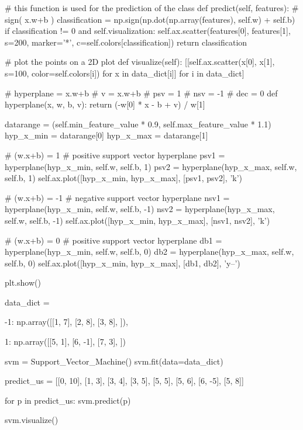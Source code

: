 \documentclass[11pt]{article}
\begin{document}
\begin{python}
    # this function is used for the prediction of the class
    def predict(self, features):
        # sign( x.w+b )
        classification = np.sign(np.dot(np.array(features),
                                        self.w) + self.b)
        if classification != 0 and self.visualization:
            self.ax.scatter(features[0], features[1], s=200,
                            marker='*', c=self.colors[classification])
        return classification

    # plot the points on a 2D plot
    def visualize(self):
        [[self.ax.scatter(x[0], x[1], s=100, color=self.colors[i])
          for x in data_dict[i]] for i in data_dict]

        # hyperplane = x.w+b
        # v = x.w+b
        # psv = 1
        # nsv = -1
        # dec = 0
        def hyperplane(x, w, b, v):
            return (-w[0] * x - b + v) / w[1]

        datarange = (self.min_feature_value * 0.9,
                     self.max_feature_value * 1.1)
        hyp_x_min = datarange[0]
        hyp_x_max = datarange[1]

        # (w.x+b) = 1
        # positive support vector hyperplane
        psv1 = hyperplane(hyp_x_min, self.w, self.b, 1)
        psv2 = hyperplane(hyp_x_max, self.w, self.b, 1)
        self.ax.plot([hyp_x_min, hyp_x_max], [psv1, psv2], 'k')

        # (w.x+b) = -1
        # negative support vector hyperplane
        nsv1 = hyperplane(hyp_x_min, self.w, self.b, -1)
        nsv2 = hyperplane(hyp_x_max, self.w, self.b, -1)
        self.ax.plot([hyp_x_min, hyp_x_max], [nsv1, nsv2], 'k')

        # (w.x+b) = 0
        # positive support vector hyperplane
        db1 = hyperplane(hyp_x_min, self.w, self.b, 0)
        db2 = hyperplane(hyp_x_max, self.w, self.b, 0)
        self.ax.plot([hyp_x_min, hyp_x_max], [db1, db2], 'y--')

        plt.show()


data_dict = {-1: np.array([[1, 7],
                           [2, 8],
                           [3, 8], ]),

             1: np.array([[5, 1],
                          [6, -1],
                          [7, 3], ])}

svm = Support_Vector_Machine()
svm.fit(data=data_dict)

predict_us = [[0, 10],
              [1, 3],
              [3, 4],
              [3, 5],
              [5, 5],
              [5, 6],
              [6, -5],
              [5, 8]]

for p in predict_us:
    svm.predict(p)

svm.visualize()
\end{python}{}
\clearpage
\end{document}
